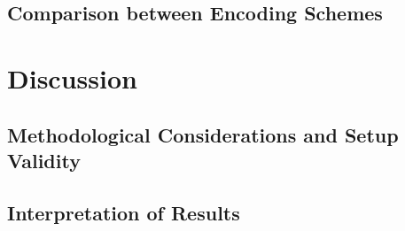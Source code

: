 \subsection{Comparison between Encoding Schemes}










\section{Discussion}  \label{sec:discussion}


\subsection{Methodological Considerations and Setup Validity}

\subsection{Interpretation of Results}

